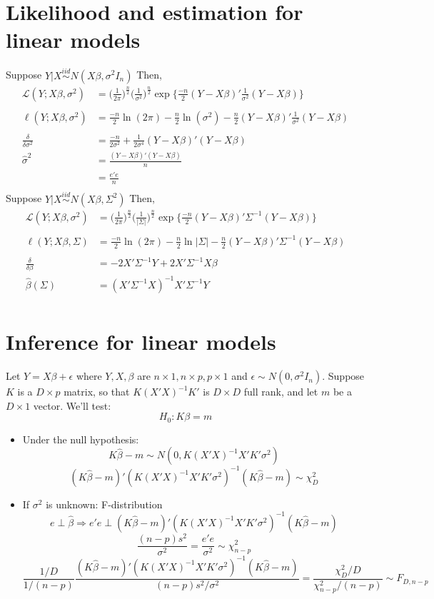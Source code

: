 \documentclass[12pt]{article}\usepackage{graphicx, color}
\theoremstyle{definition}
\renewcommand{\hat}{\widehat}
\begin{document}
\section{Likelihood and estimation for linear models}
Suppose $Y|X \stackrel{iid}{\sim} N(X \beta, \sigma^2I_n)$
Then, 
\begin{align*}\mathcal{L}(Y; X\beta, \sigma^2)&=\big(\frac{1}{2\pi}\big)^{\frac{n}{2}}\big(\frac{1}{\sigma^2}\big)^{\frac{n}{2}}\exp\{\frac{-n}{2}(Y-X\beta)'\frac{1}{\sigma^2}(Y-X\beta)\}\\
\\
\ell(Y; X\beta, \sigma^2)&=\frac{-n}{2}\ln(2\pi)-\frac{n}{2}\ln(\sigma^2)-\frac{n}{2}(Y-X\beta)'\frac{1}{\sigma^2}(Y-X\beta)\\
\\
\frac{\delta}{\delta \sigma^2}&=\frac{-n}{2\sigma^2}+\frac{1}{2\sigma^4}(Y-X\beta)'(Y-X\beta)\\
\hat \sigma^2&=\frac{(Y-X\beta)'(Y-X\beta)}{n}\\
&=\frac{e'e}{n}\\
\end{align*}
Suppose $Y|X \stackrel{iid}{\sim} N(X \beta, \Sigma^2)$
Then, 
\begin{align*}\mathcal{L}(Y; X\beta, \sigma^2)&=\big(\frac{1}{2\pi}\big)^{\frac{n}{2}}\big(\frac{1}{|\Sigma|}\big)^{\frac{n}{2}}\exp\{\frac{-n}{2}(Y-X\beta)'\Sigma^{-1}(Y-X\beta)\}\\
\\
\ell(Y; X\beta, \Sigma)&=\frac{-n}{2}\ln(2\pi)-\frac{n}{2}\ln|\Sigma|-\frac{n}{2}(Y-X\beta)'\Sigma^{-1}(Y-X\beta)\\
\\
\frac{\delta}{\delta \beta}&=-2X'\Sigma^{-1}Y+2X'\Sigma^{-1}X\beta\\
\hat \beta(\Sigma)&=(X'\Sigma^{-1}X)^{-1}X'\Sigma^{-1}Y\\
\end{align*}

\section{Inference for linear models}
Let $Y=X\beta+ \epsilon$ where $Y, X, \beta$ are $n\times 1, n\times p, p\times 1$ and $\epsilon \sim N(0, \sigma^2I_n)$. Suppose $K$ is a $D \times p$ matrix, so that $K(X'X)^{-1}K'$ is $D\times D$ full rank, and let $m$ be a $D \times 1$ vector. We'll test:
$$H_0: K \beta =m$$
\begin{itemize}
\item Under the null hypothesis: $$K\hat \beta - m \sim N(0, K(X'X)^{-1}X'K'\sigma^2)$$
$$(K\hat \beta - m)'( K(X'X)^{-1}X'K'\sigma^2)^{-1}(K\hat \beta - m)\sim \chi^2_D$$
\item If $\sigma^2$ is unknown: F-distribution
$$e \perp \hat \beta \Rightarrow e'e \perp (K\hat \beta - m)'( K(X'X)^{-1}X'K'\sigma^2)^{-1}(K\hat \beta - m)$$
$$\frac{(n-p)s^2}{\sigma^2}=\frac{e'e}{\sigma^2}\sim  \chi^2_{n-p}$$
$$\frac{1/D}{1/(n-p)}\frac{(K\hat \beta - m)'( K(X'X)^{-1}X'K'\sigma^2)^{-1}(K\hat \beta - m)}{{(n-p)s^2/\sigma^2}}=\frac{\chi^2_D /D}{\chi^2_{n-p}/(n-p)}\sim F_{D,n-p}$$
\end{itemize}
\end{document}
